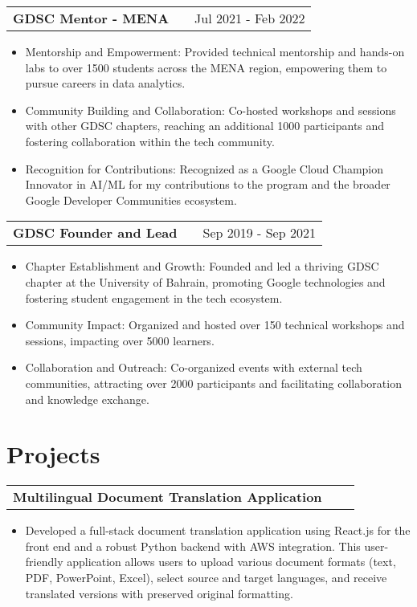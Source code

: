 \documentclass[a4paper,11pt]{article}
\makeatletter
\newenvironment{joblong}[2]
    {
    \begin{tabularx}{\linewidth}{@{}l X r@{}}
    \textbf{#1} & \hfill &  #2 \\[3.75pt]
    \end{tabularx}
    \begin{minipage}[t]{\linewidth}
    \begin{itemize}[nosep,after=\strut, leftmargin=1em, itemsep=3pt,label=--]
    }
    {
    \end{itemize}
    \end{minipage}    
    }
\newenvironment{projectlong}[2]
    {
    \begin{tabularx}{\linewidth}{@{}l X r@{}}
    \textbf{#1} & \hfill &  #2 \\[3.75pt]
    \end{tabularx}
    \begin{minipage}[t]{\linewidth}
    \begin{itemize}[nosep,after=\strut, leftmargin=1em, itemsep=3pt,label=--]
    }
    {
    \end{itemize}
    \end{minipage}    
    }
\makeatother
\begin{document}
\begin{joblong}{GDSC Mentor - MENA}{Jul 2021 - Feb 2022}
\item Mentorship and Empowerment: Provided technical mentorship and hands-on labs to over 1500 students across the MENA region, empowering them to pursue careers in data analytics.
\item Community Building and Collaboration: Co-hosted workshops and sessions with other GDSC chapters, reaching an additional 1000 participants and fostering collaboration within the tech community.
\item Recognition for Contributions: Recognized as a Google Cloud Champion Innovator in AI/ML for my contributions to the program and the broader Google Developer Communities ecosystem.

\end{joblong}

\begin{joblong}{GDSC Founder and Lead}{Sep 2019 - Sep 2021}
\item Chapter Establishment and Growth: Founded and led a thriving GDSC chapter at the University of Bahrain, promoting Google technologies and fostering student engagement in the tech ecosystem.
\item Community Impact: Organized and hosted over 150 technical workshops and sessions, impacting over 5000 learners.
\item Collaboration and Outreach: Co-organized events with external tech communities, attracting over 2000 participants and facilitating collaboration and knowledge exchange.

\end{joblong}
  
\section{Projects}

\begin{projectlong}{Multilingual Document Translation Application}{}
    \item Developed a full-stack document translation application using React.js for the front end and a robust Python backend with AWS integration. This user-friendly application allows users to upload various document formats (text, PDF, PowerPoint, Excel), select source and target languages, and receive translated versions with preserved original formatting.
\end{projectlong}
\end{document}
